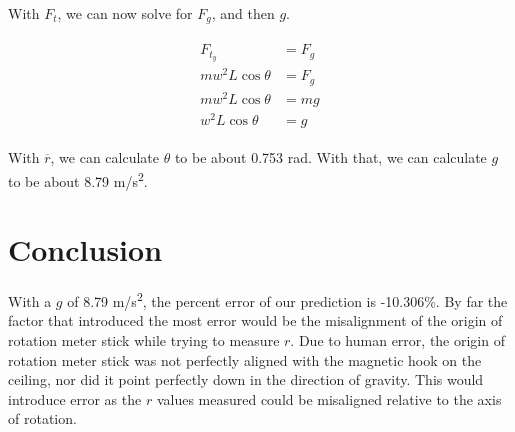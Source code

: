 \documentclass[12pt]{article}
\begin{document}
With $F_t$, we can now solve for $F_g$, and then $g$.

\begin{align*}
    \begin{split}
        F_{t_y} &= F_g \\ 
        m w^2 L \cos \theta &= F_g \\
        m w^2 L \cos \theta &= mg \\
        w^2 L \cos \theta &= g
    \end{split}
\end{align*}

With $\overline{r}$, we can calculate $\theta$ to be about 0.753 rad. With that,
we can calculate $g$ to be about 8.79 m/s\textsuperscript{2}.

\section{Conclusion}

With a $g$ of 8.79 m/s\textsuperscript{2}, the percent error of our prediction
is -10.306\%. By far the factor that introduced the most error would be the
misalignment of the origin of rotation meter stick while trying to measure $r$.
Due to human error, the origin of rotation meter stick was not perfectly aligned
with the magnetic hook on the ceiling, nor did it point perfectly down in the
direction of gravity. This would introduce error as the $r$ values measured
could be misaligned relative to the axis of rotation.
\end{document}
